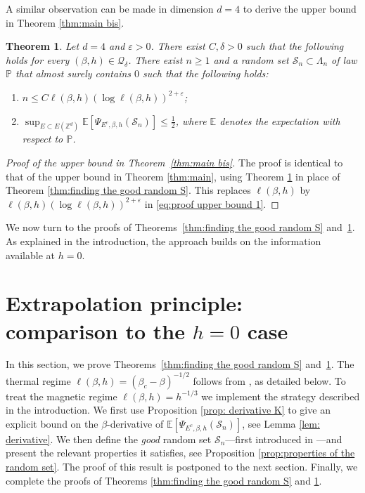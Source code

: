 \documentclass[10pt,a4paper]{amsart}
\numberwithin{equation}{section}
\newtheorem{Thm}{Theorem}[section]
\begin{document}
 A similar observation can be made in dimension $d=4$ to derive the upper bound in Theorem \ref{thm:main bis}.  
 \begin{Thm}\label{thm:finding the good random S d=4} Let $d=4$ and $\varepsilon>0$. There exist $C,\delta >0$ such that the following holds for every $(\beta,h)\in \mathcal Q_\delta$. There exist $n\geq 1$ and a random set $\mathcal S_n\subset \Lambda_n$ of law $\mathbb P$ that almost surely contains $0$ such that the following holds:
\begin{enumerate}
	\item[$(i)$] $n\leq C\ell(\beta,h)(\log \ell(\beta,h))^{2+\varepsilon}$;
	\item[$(ii)$] $\sup_{E\subset E(\mathbb Z^d)}\mathbb E[\Psi_{E^c,\beta,h}(\mathcal S_n)]\leq \tfrac{1}{2}$, where $\mathbb E$ denotes the expectation with respect to $\mathbb P$.
\end{enumerate}
\end{Thm}


\begin{proof}[Proof of the upper bound in Theorem~\textup{\ref{thm:main bis}}] The proof is identical to that of the upper bound in Theorem \ref{thm:main}, using Theorem \ref{thm:finding the good random S d=4} in place of Theorem \ref{thm:finding the good random S}. This replaces $\ell(\beta,h)$ by $\ell(\beta,h)(\log \ell(\beta,h))^{2+\varepsilon}$ in \eqref{eq:proof upper bound 1}.
\end{proof}


We now turn to the proofs of 
Theorems~\ref{thm:finding the good random S} 
and~\ref{thm:finding the good random S d=4}. As explained in the 
introduction, the approach builds on the information available at $h=0$.

\section{Extrapolation principle: comparison to the $h=0$ case}\label{sec:extrapolation}

In this section, we prove Theorems~\ref{thm:finding the good random S} 
and~\ref{thm:finding the good random S d=4}. The thermal regime $\ell(\beta,h)=(\beta_c-\beta)^{-1/2}$ follows from 
\cite{DuminilPanis2024newLB}, as detailed below. To treat the magnetic regime $\ell(\beta,h)=h^{-1/3}$ we implement the strategy described in the introduction. We first use Proposition \ref{prop: derivative K} to give an explicit bound on the $\beta$-derivative of $\mathbb E[\Psi_{E^c,\beta,h}(\mathcal S_n)]$, see Lemma \ref{lem: derivative}. We then define the \emph{good} random set $\mathcal S_n$---first introduced in \cite{DuminilPanis2024newLB}---and present the relevant properties it satisfies, see Proposition \ref{prop:properties of the random set}. The proof of this result is postponed to the next section. Finally, we complete the proofs of Theorems \ref{thm:finding the good random S} and \ref{thm:finding the good random S d=4}.
\end{document}
